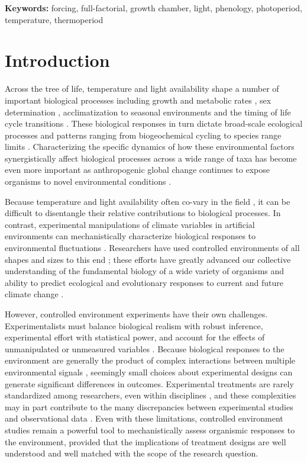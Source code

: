 \documentclass[11pt]{article}
\begin{document}
\textbf{Keywords:}  forcing, full-factorial,  growth chamber, light,  phenology, photoperiod, temperature, thermoperiod \\
\pagebreak
\section*{Introduction}

\noindent Across the tree of life, temperature and light availability shape a number of important biological processes including growth and metabolic rates \citep{MacLean:2019aa}, sex determination \citep{Brown:2014vn}, acclimatization to seasonal environments \citep{Hamilton2016} and the timing of life cycle transitions \citep[i.e., phenology,][]{Forrest2010}. These biological responses in turn dictate broad-scale ecological processes and patterns ranging from biogeochemical cycling \citep{Piao2007} to species range limits \citep{Chuine2001}. Characterizing the specific dynamics of how these environmental factors synergistically affect biological processes across a wide range of taxa has become even more important as anthropogenic global change continues to expose organisms to novel environmental conditions \citep{Portner:2008vd}.

\noindent Because temperature and light availability often co-vary in the field \citep[for example, in most temperate ecosystems, daylength and temperature both increase as the season progresses,][]{Rosenberg1974}, it can be difficult to disentangle their relative contributions to biological processes. In contrast, experimental manipulations of climate variables in artificial environments can mechanistically characterize biological responses to environmental fluctuations \citep{Ettinger:2020aa,Primack2015}. Researchers have used controlled environments of all shapes and sizes to this end \citep{Downs:1980us}; these efforts have greatly advanced our collective understanding of the fundamental biology of a wide variety of organisms and ability to predict ecological and evolutionary responses to current and future climate change \citep{Stewart:2013wz}.

However, controlled environment experiments have their own challenges. Experimentalists must balance biological realism with robust inference, experimental effort with statistical power, and account for the effects of unmanipulated or unmeasured variables \citep{schneiner2001}. Because biological responses to the environment are generally the product of complex interactions between multiple environmental signals \citep{Casal:2002vz}, seemingly small choices about experimental designs can generate significant differences in outcomes. Experimental treatments are rarely standardized among researchers, even within disciplines \citep{Wolkovich:2022ue}, and these complexities may in part contribute to the many discrepancies between experimental studies and observational data \citep{Poorter:2016aa}. Even with these limitations, controlled environment studies remain a powerful tool to mechanistically assess organismic responses to the environment, provided that the implications of treatment designs are well understood and well matched with the scope of the research question. 
\end{document}
